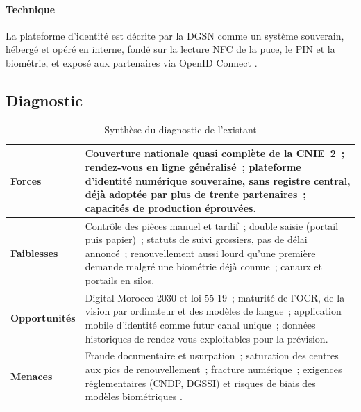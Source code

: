\paragraph{Technique} La plateforme d'identité est décrite par la DGSN comme un système souverain, hébergé et opéré en interne, fondé sur la lecture NFC de la puce, le PIN et la biométrie, et exposé aux partenaires via OpenID Connect \cite{dgsn2023tcn, oidc}.

\subsection{Diagnostic}
\begin{table}[h]
\caption{Synthèse du diagnostic de l'existant}
\label{tab:diag}
\centering
\small
\begin{tabularx}{\columnwidth}{lX}
\toprule
\textbf{Forces} & Couverture nationale quasi complète de la CNIE~2~; rendez-vous en ligne généralisé~; plateforme d'identité numérique souveraine, sans registre central, déjà adoptée par plus de trente partenaires~; capacités de production éprouvées. \\
\midrule
\textbf{Faiblesses} & Contrôle des pièces manuel et tardif~; double saisie (portail puis papier)~; statuts de suivi grossiers, pas de délai annoncé~; renouvellement aussi lourd qu'une première demande malgré une biométrie déjà connue~; canaux et portails en silos. \\
\midrule
\textbf{Opportunités} & Digital Morocco 2030 et loi 55-19~; maturité de l'OCR, de la vision par ordinateur et des modèles de langue~; application mobile d'identité comme futur canal unique~; données historiques de rendez-vous exploitables pour la prévision. \\
\midrule
\textbf{Menaces} & Fraude documentaire et usurpation~; saturation des centres aux pics de renouvellement~; fracture numérique~; exigences réglementaires (CNDP, DGSSI) et risques de biais des modèles biométriques \cite{grother2019frvt}. \\
\bottomrule
\end{tabularx}
\end{table}
